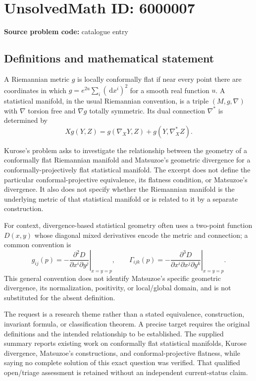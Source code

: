\documentclass[11pt]{article}
\newcommand{\dd}{\,\mathrm{d}}
\begin{document}
\section*{UnsolvedMath ID: 6000007}
\textbf{Source problem code:} catalogue entry
\subsection{Definitions and mathematical statement}
A Riemannian metric \(g\) is locally conformally flat if near every point there are coordinates in which \(g=e^{2u}\sum_i(\dd x^i)^2\) for a smooth real function \(u\). A statistical manifold, in the usual Riemannian convention, is a triple \((M,g,\nabla)\) with \(\nabla\) torsion free and \(\nabla g\) totally symmetric. Its dual connection \(\nabla^*\) is determined by
\[
 Xg(Y,Z)=g(\nabla_XY,Z)+g(Y,\nabla_X^*Z).
\]

Kurose's problem asks to investigate the relationship between the geometry of a conformally flat Riemannian manifold and Matsuzoe's geometric divergence for a conformally-projectively flat statistical manifold. The excerpt does not define the particular conformal-projective equivalence, its flatness condition, or Matsuzoe's divergence. It also does not specify whether the Riemannian manifold is the underlying metric of that statistical manifold or is related to it by a separate construction.

For context, divergence-based statistical geometry often uses a two-point function \(D(x,y)\) whose diagonal mixed derivatives encode the metric and connection; a common convention is
\[
 g_{ij}(p)=-\left.\frac{\partial^2D}{\partial x^i\partial y^j}\right|_{x=y=p},\qquad
 \Gamma_{ijk}(p)=-\left.\frac{\partial^3D}{\partial x^i\partial x^j\partial y^k}\right|_{x=y=p}.
\]
This general convention does not identify Matsuzoe's specific geometric divergence, its normalization, positivity, or local/global domain, and is not substituted for the absent definition.

The request is a research theme rather than a stated equivalence, construction, invariant formula, or classification theorem. A precise target requires the original definitions and the intended relationship to be established. The supplied summary reports existing work on conformally flat statistical manifolds, Kurose divergence, Matsuzoe's constructions, and conformal-projective flatness, while saying no complete solution of this exact question was verified. That qualified open/triage assessment is retained without an independent current-status claim.
\end{document}
